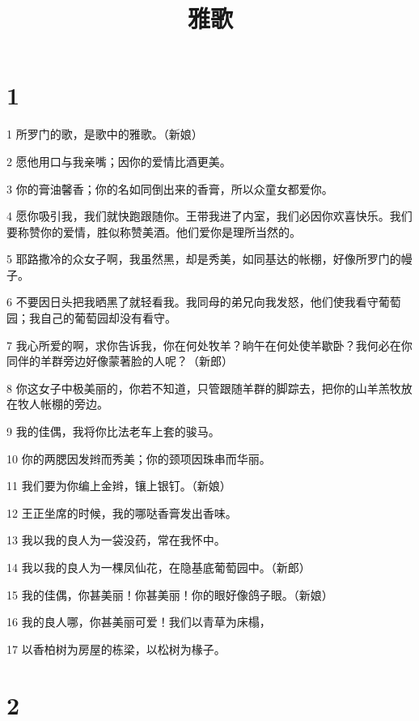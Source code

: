 

\title{雅歌}


\chapter{1}

\par 1 所罗门的歌，是歌中的雅歌。（新娘）
\par 2 愿他用口与我亲嘴；因你的爱情比酒更美。
\par 3 你的膏油馨香；你的名如同倒出来的香膏，所以众童女都爱你。
\par 4 愿你吸引我，我们就快跑跟随你。王带我进了内室，我们必因你欢喜快乐。我们要称赞你的爱情，胜似称赞美酒。他们爱你是理所当然的。
\par 5 耶路撒冷的众女子啊，我虽然黑，却是秀美，如同基达的帐棚，好像所罗门的幔子。
\par 6 不要因日头把我晒黑了就轻看我。我同母的弟兄向我发怒，他们使我看守葡萄园；我自己的葡萄园却没有看守。
\par 7 我心所爱的啊，求你告诉我，你在何处牧羊？晌午在何处使羊歇卧？我何必在你同伴的羊群旁边好像蒙著脸的人呢？（新郎）
\par 8 你这女子中极美丽的，你若不知道，只管跟随羊群的脚踪去，把你的山羊羔牧放在牧人帐棚的旁边。
\par 9 我的佳偶，我将你比法老车上套的骏马。
\par 10 你的两腮因发辫而秀美；你的颈项因珠串而华丽。
\par 11 我们要为你编上金辫，镶上银钉。（新娘）
\par 12 王正坐席的时候，我的哪哒香膏发出香味。
\par 13 我以我的良人为一袋没药，常在我怀中。
\par 14 我以我的良人为一棵凤仙花，在隐基底葡萄园中。（新郎）
\par 15 我的佳偶，你甚美丽！你甚美丽！你的眼好像鸽子眼。（新娘）
\par 16 我的良人哪，你甚美丽可爱！我们以青草为床榻，
\par 17 以香柏树为房屋的栋梁，以松树为椽子。

\chapter{2}


